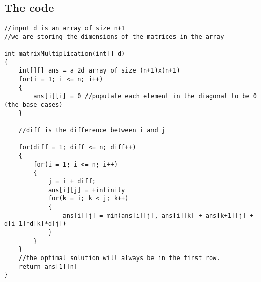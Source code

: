 \documentclass[12pt]{book}
\begin{document}
\subsection*{The code}

\begin{lstlisting}
//input d is an array of size n+1
//we are storing the dimensions of the matrices in the array

int matrixMultiplication(int[] d)
{
    int[][] ans = a 2d array of size (n+1)x(n+1)
    for(i = 1; i <= n; i++)
    {
        ans[i][i] = 0 //populate each element in the diagonal to be 0 (the base cases)
    }

    //diff is the difference between i and j

    for(diff = 1; diff <= n; diff++)
    {
        for(i = 1; i <= n; i++)
        {
            j = i + diff;
            ans[i][j] = +infinity
            for(k = i; k < j; k++)
            {
                ans[i][j] = min(ans[i][j], ans[i][k] + ans[k+1][j] + d[i-1]*d[k]*d[j])
            }
        }
    }
    //the optimal solution will always be in the first row.
    return ans[1][n]
}
\end{lstlisting}
\end{document}
